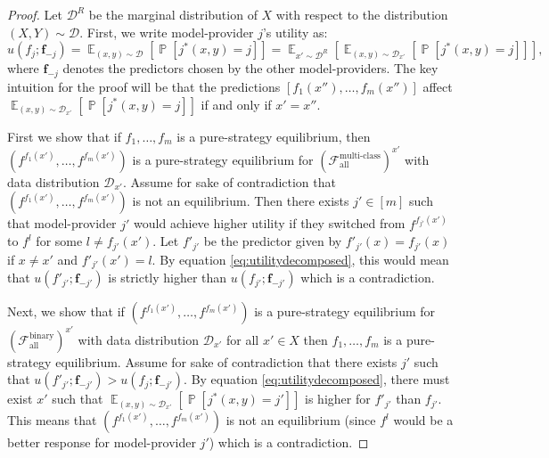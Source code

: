 \documentclass[letterpaper,11pt]{article}
\theoremstyle{plain}
\DeclareMathOperator*{\E}{\mathbb{E}}
\DeclareMathOperator*{\Prob}{\mathbb{P}}
\begin{document}
\begin{proof}
Let $\mathcal{D}^R$ be the marginal distribution of $X$ with respect to the distribution $(X,Y) \sim \mathcal{D}$. First, we write model-provider $j$'s utility as:
\begin{equation}
\label{eq:utilitydecomposed}
  u(f_j; \mathbf{f}_{-j}) = \E_{(x,y) \sim \mathcal{D}} \left[\Prob[j^*(x,y) = j] \right] =  \E_{x' \sim \mathcal{D}^R} \left[\E_{(x,y) \sim \mathcal{D}_{x'}} \left[\Prob[j^*(x,y) = j] \right]\right],
\end{equation}
where $\textbf{f}_{-j}$ denotes the predictors chosen by the other model-providers. The key intuition for the proof will be that the predictions $[f_1(x''), \ldots, f_m(x'')]$ affect $\E_{(x,y) \sim \mathcal{D}_{x'}} \left[\Prob[j^*(x,y) = j] \right]$ if and only if $x' = x''$. 

First we show that if $f_1, \ldots, f_m$ is a pure-strategy equilibrium, then $(f^{f_1(x')}, \ldots, f^{f_m(x')})$ is a pure-strategy equilibrium for $(\mathcal{F}^{\text{multi-class}}_{\text{all}})^{x'}$ with data distribution $\mathcal{D}_{x'}$. Assume for sake of contradiction that $(f^{f_1(x')}, \ldots, f^{f_m(x')})$ is not an equilibrium. Then there exists $j' \in [m]$ such that model-provider $j'$ would achieve higher utility if they switched from $f^{f_{j'}(x')}$ to $f^{l}$ for some $l \neq f_{j'}(x')$. Let $f'_{j'}$ be the predictor given by $f'_{j'}(x) = f_{j'}(x)$ if $x \neq x'$ and $f'_{j'}(x') = l$. By equation \eqref{eq:utilitydecomposed}, this would mean that $u(f'_{j'}; \mathbf{f}_{-j'})$ is strictly higher than $u(f_{j'}; \mathbf{f}_{-j'})$ which is a contradiction.

Next, we show that if $(f^{f_1(x')}, \ldots, f^{f_m(x')})$ is a pure-strategy equilibrium for $(\mathcal{F}^{\text{binary}}_{\text{all}})^{x'}$ with data distribution $\mathcal{D}_{x'}$ for all $x' \in X$ then $f_1, \ldots, f_m$ is a pure-strategy equilibrium. Assume for sake of contradiction that there exists $j'$ such that $u(f'_{j'}; \mathbf{f}_{-j'}) > u(f_j; \mathbf{f}_{-j'})$. By equation \eqref{eq:utilitydecomposed}, there must exist $x'$ such that  $\E_{(x,y) \sim \mathcal{D}_{x'}} \left[\Prob[j^*(x,y) = j'] \right]$ is higher for $f'_{j'}$ than $f_{j'}$. This means that $(f^{f_1(x')}, \ldots, f^{f_m(x')})$ is not an equilibrium (since $f^{l}$ would be a better response for model-provider $j'$) which is a contradiction.  
\end{proof}
\end{document}
